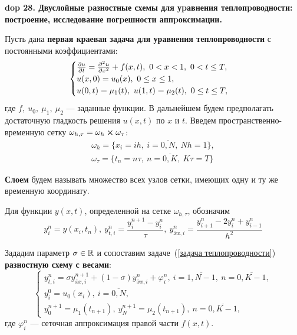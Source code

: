\textbf{\LARGE dop 28. Двуслойные pазностные схемы для уpавнения теплопpоводности: постpоение, исследование погpешности аппpоксимации.}

\renewcommand{\theequation}{\arabic{equation}} 
\setcounter{equation}{0}

\newcommand{\ddev}[1]{#1_{\overline{x}x,i}}
\newcommand{\deln}[3]{\frac{\partial^{#3} #1}{\partial #2^{#3}}}

\begin{Commentwhite}
Пусть дана \textbf{первая краевая задача для уравнения теплопроводности} с постоянными коэффициентами:
\begin{equation}
    \label{задача теплопроводности}
    \begin{cases}
        \frac{\partial u}{\partial t} = \frac{\partial^2 u}{\partial x^2} + f(x, t),~0 < x < 1,~0 < t \le T,
        \\
        u(x, 0) = u_0(x),~0 \le x \le 1,
        \\
        u(0, t) = \mu_1(t),~u(1, t) = \mu_2(t),~0 \le t \le T,
    \end{cases}
\end{equation}
где $f,~u_0,~\mu_1,~\mu_2$ --- заданные функции. В дальнейшем будем предполагать достаточную гладкость решения $u(x,t)$ по $x$ и $t$. Введем пространственно-временную сетку $\omega_{h,\tau} = \omega_h \cross \omega_{\tau}$:
\begin{gather*}
    \omega_h = \{ x_i = ih,~i=\overline{0,N},~Nh = 1 \},
    \\
    \omega_\tau = \{ t_n = n\tau,~n=\overline{0,K},~K\tau = T \}
\end{gather*}

\begin{definition}
\textbf{Слоем} будем называть множество всех узлов сетки, имеющих одну и ту же временную координату.
\end{definition}

Для функции $y(x, t)$, определенной на сетке $\omega_{h,\tau}$, обозначим
$$y_i^n = y(x_i, t_n),~y_{t,i}^n = \frac{y_i^{n+1} - y_i^n}{\tau},~\ddev{y}^n = \frac{y_{i+1}^n - 2y_i^n + y_{i-1}^n}{h^2}$$

Зададим параметр $\sigma\in{\mathbb{R}}$ и сопоставим задаче~(\ref{задача теплопроводности}) \textbf{разностную схему с весами}:
\begin{equation}
    \label{двуслойная схема с весами}
    \begin{cases}
        y_{t,i}^n = \sigma \ddev{y}^{n+1} + (1 - \sigma)\ddev{y}^n + \varphi_i^n,~i=\overline{1,N-1},~n=\overline{0,K-1},
        \\
        y_i^0 = u_0(x_i),~i=\overline{0,N},
        \\
        y_0^{n+1} = \mu_1(t_{n+1}),~y_N^{n+1} = \mu_2(t_{n+1}),~n=\overline{0,K-1},
    \end{cases}
\end{equation}
где $\varphi_i^n$ --- сеточная аппроксимация правой части $f(x,t)$.


\end{Commentwhite}
